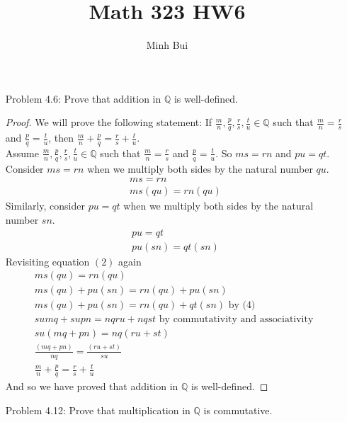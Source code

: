 \documentclass{article}
\author{Minh Bui}
\title{Math 323 HW6}
\theoremstyle{claim}
\theoremstyle{definition}
\begin{document}
\maketitle
\begin{enumerate}
    \item[Problem 4.6:] Prove that addition in $\mathbb{Q}$ is well-defined.
        \begin{proof}
            We will prove the following statement: If $\frac{m}{n}, \frac{p}{q}, \frac{r}{s}, \frac{t}{u} \in \mathbb{Q}$ such that $\frac{m}{n} = \frac{r}{s}$ and $\frac{p}{q} = \frac{t}{u}$, then $\frac{m}{n} + \frac{p}{q} = \frac{r}{s} + \frac{t}{u}$.\\
            Assume $\frac{m}{n}, \frac{p}{q}, \frac{r}{s}, \frac{t}{u} \in \mathbb{Q}$ such that $\frac{m}{n} = \frac{r}{s}$ and $\frac{p}{q} = \frac{t}{u}$. So $ms = rn$ and $pu = qt$. Consider $ms = rn$ when we multiply both sides by the natural number $qu$.
            \begin{gather}
                ms = rn\\
                ms(qu) = rn(qu)
            \end{gather}
            Similarly, consider $pu = qt$ when we multiply both sides by the natural number $sn$.
            \begin{gather}
                pu = qt\\
                pu(sn) = qt(sn)
            \end{gather}
            Revisiting equation $(2)$ again
            \begin{gather*}
                ms(qu) = rn(qu)\\
                ms(qu) + pu(sn) = rn(qu) + pu(sn)\\
                ms(qu) + pu(sn) = rn(qu) + qt(sn) \text{ by (4) }\\
                sumq + supn = nqru + nqst \text{ by commutativity and associativity }\\
                su(mq + pn) = nq(ru + st)\\
                \frac{(mq + pn)}{nq} = \frac{(ru + st)}{su}\\
                \frac{m}{n} + \frac{p}{q} = \frac{r}{s} + \frac{t}{u}
            \end{gather*}
            And so we have proved that addition in $\mathbb{Q}$ is well-defined.
        \end{proof}
    \item[Problem 4.12:] Prove that multiplication in $\mathbb{Q}$ is commutative.

\end{enumerate}
\end{document}
